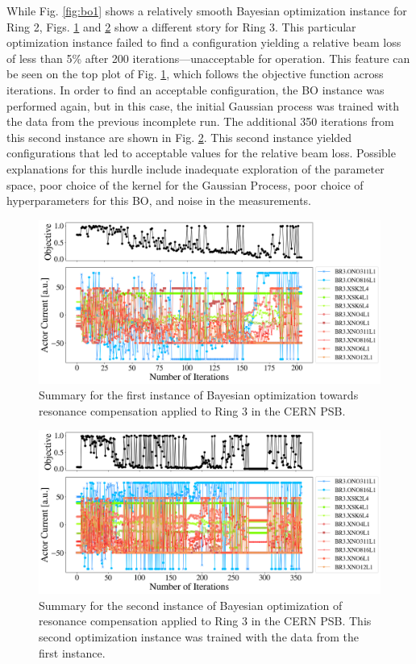 While Fig. \ref{fig:bo1} shows a relatively smooth Bayesian optimization instance for Ring 2, Figs. \ref{fig:bo21} and \ref{fig:bo22} show a different story for Ring 3. This particular optimization instance failed to find a configuration yielding a relative beam loss of less than 5\% after 200 iterations---unacceptable for operation. This feature can be seen on the top plot of Fig. \ref{fig:bo21}, which follows the objective function across iterations. In order to find an acceptable configuration, the BO instance was performed again, but in this case, the initial Gaussian process was trained with the data from the previous incomplete run. The additional 350 iterations from this second instance are shown in Fig. \ref{fig:bo22}. This second instance yielded configurations that led to acceptable values for the relative beam loss. Possible explanations for this hurdle include inadequate exploration of the parameter space, poor choice of the kernel for the Gaussian Process, poor choice of hyperparameters for this BO, and noise in the measurements.

\begin{figure}[H]
    \centering
    \includegraphics[width=\linewidth]{chapter5/2023_05_02_R3_LHCramp_BayesOpt.png}
    \caption{Summary for the first instance of Bayesian optimization towards resonance compensation applied to Ring 3 in the CERN PSB.}
    \label{fig:bo21}
\end{figure}

\begin{figure}[H]
    \centering
    \includegraphics[width=\linewidth]{chapter5/2023_05_02_R3_LHCramp_BayesOpt_itrtn2.png}
    \caption{Summary for the second instance of Bayesian optimization of resonance compensation applied to Ring 3 in the CERN PSB. This second optimization instance was trained with the data from the first instance.}
    \label{fig:bo22}
\end{figure}

